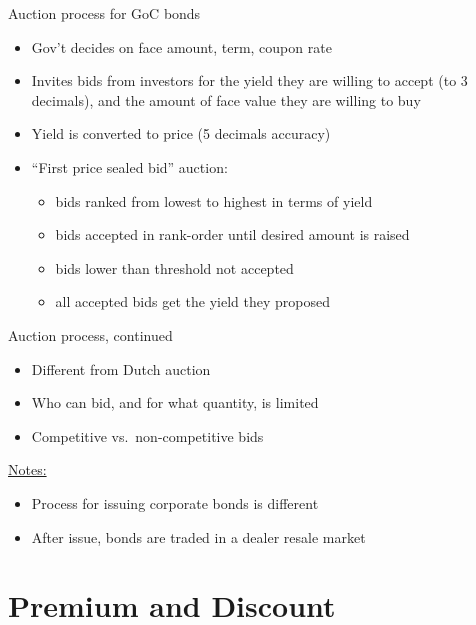 \documentclass{beamer}
\begin{document}
\begin{frame}{Auction process for GoC bonds}

\begin{itemize}
\item Gov't decides on face amount, term, coupon rate
\item Invites bids from investors for the yield they are willing to accept (to 3 decimals), and the amount of face value they are willing to buy
\item Yield is converted to price (5 decimals accuracy)
\item ``First price sealed bid'' auction:
  \begin{itemize}
  \item bids ranked from lowest to highest in terms of yield
  \item bids accepted in rank-order until desired amount is raised
  \item bids lower than threshold not accepted
  \item all accepted bids get the yield they proposed
  \end{itemize}
\end{itemize}

\end{frame}

\begin{frame}{Auction process, continued}

\begin{itemize}
\item Different from Dutch auction
\item Who can bid, and for what quantity, is limited
\item Competitive vs.\ non-competitive bids
\end{itemize}

\bigskip
\underline{Notes:}
\begin{itemize}
\item Process for issuing corporate bonds is different
\item After issue, bonds are traded in a dealer resale market
\end{itemize}

\end{frame}

\section{Premium and Discount}
\end{document}
